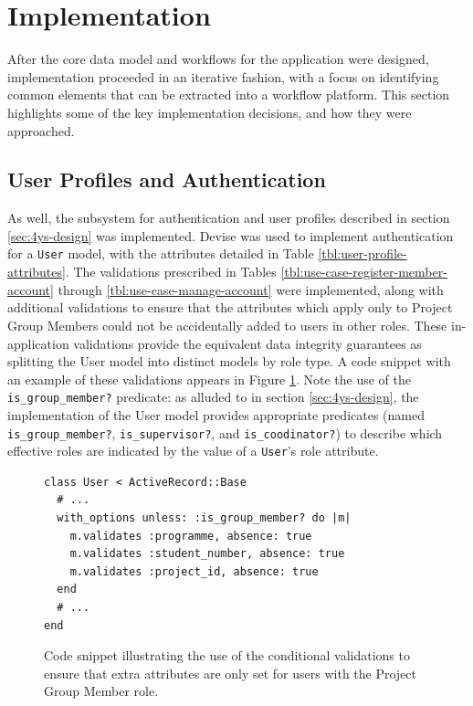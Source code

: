 \documentclass[document.tex]{subfiles}
\begin{document}
\section{Implementation}
\label{sec:4ys-implementation}

After the core data model and workflows for the application were designed, implementation proceeded in an iterative fashion, with a focus on identifying common elements that can be extracted into a workflow platform. This section highlights some of the key implementation decisions, and how they were approached.


\subsection{User Profiles and Authentication}
\label{sec:4ys-authentication}


As well, the subsystem for authentication and user profiles described in section \ref{sec:4ys-design} was implemented. Devise was used to implement authentication for a \verb!User! model, with the attributes detailed in Table \ref{tbl:user-profile-attributes}. The validations prescribed in Tables \ref{tbl:use-case-register-member-account} through \ref{tbl:use-case-manage-account} were implemented, along with additional validations to ensure that the attributes which apply only to Project Group Members could not be accidentally added to users in other roles. These in-application validations provide the equivalent data integrity guarantees as splitting the User model into distinct models by role type. A code snippet with an example of these validations appears in Figure \ref{fig:4ys-user-validations}. Note the use of the \verb!is_group_member?! predicate: as alluded to in section \ref{sec:4ys-design}, the implementation of the User model provides appropriate predicates (named \verb!is_group_member?!, \verb!is_supervisor?!, and \verb!is_coodinator?!) to describe which effective roles are indicated by the value of a \verb!User!’s role attribute.

\begin{figure}[!ht]
  \begin{lstlisting}
class User < ActiveRecord::Base
  # ...
  with_options unless: :is_group_member? do |m|
    m.validates :programme, absence: true
    m.validates :student_number, absence: true
    m.validates :project_id, absence: true
  end
  # ...
end
  \end{lstlisting}
  \caption{Code snippet illustrating the use of the conditional validations to ensure that extra attributes are only set for users with the Project Group Member role.}
  \label{fig:4ys-user-validations}
\end{figure}
\end{document}

